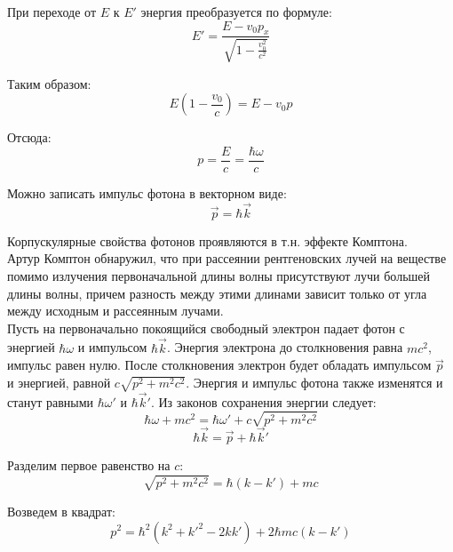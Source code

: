 \documentclass{article}
\begin{document}
	При переходе от $E$ к $E'$ энергия преобразуется по формуле:
	\begin{equation}
		E' = \frac{E-v_0 p_x}{\sqrt{1-\frac{v_0^2}{c^2}}}
	\end{equation}

	Таким образом:
	\begin{equation}
		E(1-\frac{v_0}{c}) = E - v_0 p
	\end{equation}

	Отсюда:
	\begin{equation}
		p = \frac{E}{c} = \frac{\hbar\omega}{c}
	\end{equation}

	Можно записать импульс фотона в векторном виде:
	\begin{equation}
		\vec p = \hbar\vec k
	\end{equation}

	Корпускулярные свойства фотонов проявляются в т.н. эффекте Комптона.\\

	Артур Комптон обнаружил, что при рассеянии рентгеновских лучей на веществе помимо излучения первоначальной длины волны присутствуют лучи большей длины волны, причем разность между этими длинами зависит только от угла между исходным и рассеянным лучами.\\

	Пусть на первоначально покоящийся свободный электрон падает фотон с энергией $\hbar\omega$ и импульсом $\hbar\vec k$. Энергия электрона до столкновения равна $mc^2$, импульс равен нулю. После столкновения электрон будет обладать импульсом $\vec p$ и энергией, равной $c\sqrt{p^2 + m^2c^2}$. Энергия и импульс фотона также изменятся и станут равными $\hbar\omega'$ и $\hbar\vec k'$. Из законов сохранения энергии следует:
	\begin{equation}
		\hbar\omega + mc^2 = \hbar\omega' + c\sqrt{p^2+m^2c^2}
	\end{equation}
	\begin{equation}
		\hbar\vec k = \vec p + \hbar\vec k'
	\end{equation}

	Разделим первое равенство на $c$:
	\begin{equation}
		\sqrt{p^2+m^2c^2} = \hbar(k-k') + mc
	\end{equation}

	Возведем в квадрат:
	\begin{equation}
		p^2 = \hbar^2(k^2+k'^2-2kk')+2\hbar mc(k-k')
	\end{equation}
\end{document}

